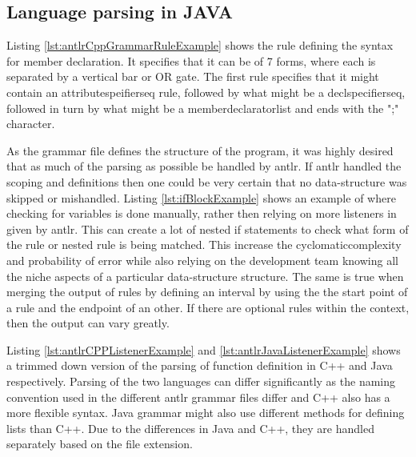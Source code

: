 \subsection{Language parsing in JAVA} \label{subsection:parsingJava}


Listing \ref{lst:antlrCppGrammarRuleExample} shows the rule defining the syntax for member declaration. 
It specifies that it can be of 7 forms, where each is separated by a vertical bar or OR gate. The first rule specifies that it might contain an attributespeifierseq rule, followed by what might be a declspecifierseq, followed in turn by what might be a memberdeclaratorlist and ends with the ";" character. 


As the grammar file defines the structure of the program, it was highly desired that as much of the parsing as possible be handled by \gls{antlr}. If \gls{antlr} handled the scoping and definitions then one could be very certain that no data-structure was skipped or mishandled. Listing \ref{lst:ifBlockExample} shows an example of where checking for variables is done manually, rather then relying on more listeners in given by \gls{antlr}. This can create a lot of nested if statements to check what form of the rule or nested rule is being matched. This increase the \Gls{cyclomaticcomplexity} and probability of error while also relying on the development team knowing all the niche aspects of a particular data-structure structure. The same is true when merging the output of rules by defining an interval by using the the start point of a rule and the endpoint of an other. If there are optional rules within the context, then the output can vary greatly. 





Listing \ref{lst:antlrCPPListenerExample} and \ref{lst:antlrJavaListenerExample} shows a trimmed down version of the parsing of function definition in C++ and Java respectively. Parsing of the two languages can differ significantly as the naming convention used in the different \gls{antlr} grammar files differ and C++ also has a more flexible syntax. Java grammar might also use different methods for defining lists than C++. 
Due to the differences in Java and C++, they are handled separately based on the file extension. 


